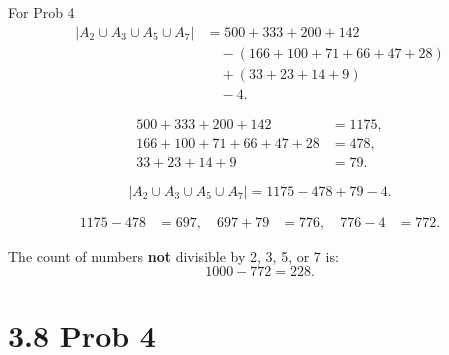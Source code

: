 \documentclass{report}
\begin{document}
\begin{RemarkWithLily}{For Prob 4}
  \[
  \begin{aligned}
  |A_2 \cup A_3 \cup A_5 \cup A_7| &= 500 + 333 + 200 + 142 \\
  &\quad - (166 + 100 + 71 + 66 + 47 + 28) \\
  &\quad + (33 + 23 + 14 + 9) \\
  &\quad - 4.
  \end{aligned}
  \]
  
  \[
  \begin{aligned}
  500+333+200+142 &= 1175, \\
  166+100+71+66+47+28 &= 478, \\
  33+23+14+9 &= 79.
  \end{aligned}
  \]
  
  \[
  |A_2 \cup A_3 \cup A_5 \cup A_7| = 1175 - 478 + 79 - 4.
  \]
  
  \[
  \begin{aligned}
  1175 - 478 &= 697, \quad 
  697 + 79 &= 776, \quad
  776 - 4 &= 772.
  \end{aligned}
  \]
  
  The count of numbers \textbf{not} divisible by 2, 3, 5, or 7 is:
  \[
  1000 - 772 = 228.
  \]

\end{RemarkWithLily}

\section*{3.8 Prob 4}

\end{document}

